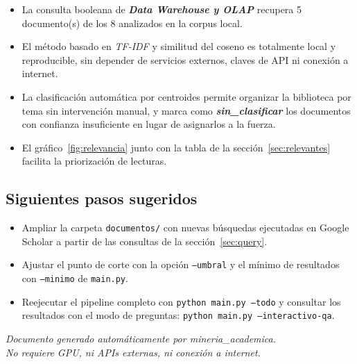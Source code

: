 \documentclass[11pt,a4paper]{article}
\newcommand{\tema}[1]{\textbf{\textit{#1}}}
\begin{document}
\begin{itemize}
\setlength{\itemsep}{4pt}
  \item La consulta booleana de \tema{ Data Warehouse y OLAP } recupera
        5 documento(s) de los 8
        analizados en la corpus local.
  \item El método basado en \textit{TF-IDF} y similitud del coseno es
        totalmente local y reproducible, sin depender de servicios externos,
        claves de API ni conexión a internet.
  \item La clasificación automática por centroides permite organizar la
        biblioteca por tema sin intervención manual, y marca como
        \tema{sin\_clasificar} los documentos con confianza insuficiente en
        lugar de asignarlos a la fuerza.
  \item El gráfico~\ref{fig:relevancia} junto con la tabla de la
        sección~\ref{sec:relevantes} facilita la priorización de lecturas.
\end{itemize}

\subsection*{Siguientes pasos sugeridos}

\begin{itemize}
\setlength{\itemsep}{3pt}
  \item Ampliar la carpeta \texttt{documentos/} con nuevas búsquedas
        ejecutadas en Google Scholar a partir de las consultas de la
        sección~\ref{sec:query}.
  \item Ajustar el punto de corte con la opción \texttt{--umbral} y el mínimo
        de resultados con \texttt{--minimo} de \texttt{main.py}.
  \item Reejecutar el pipeline completo con \texttt{python main.py --todo}
        y consultar los resultados con el modo de preguntas:
        \texttt{python main.py --interactivo-qa}.
\end{itemize}

\vfill
\begin{center}
\small
\textit{Documento generado automáticamente por mineria\_academica.\\
No requiere GPU, ni APIs externas, ni conexión a internet.}
\end{center}
\end{document}
